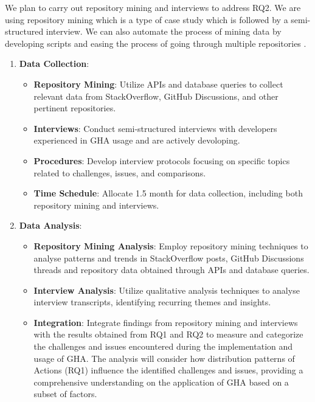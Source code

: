 \documentclass[conference]{IEEEtran}
\begin{document}
        We plan to carry out repository mining and interviews to address RQ2. We are using repository mining which is  a type of case study which is followed by a semi-structured interview. We can also automate the process of mining data by developing scripts and easing the process of going through multiple repositories \cite{chaturvedi2013tools}.\\

        \begin{enumerate}
            \item \textbf{Data Collection}:\\
            \begin{itemize}
                \item \textbf{Repository Mining}: Utilize APIs and database queries to collect relevant data from StackOverflow, GitHub Discussions, and other pertinent repositories.
                \item \textbf{Interviews}: Conduct semi-structured interviews with developers experienced in GHA usage and are actively devoloping.
                \item \textbf{Procedures}: Develop interview protocols focusing on specific topics related to challenges, issues, and comparisons.
                \item \textbf{Time Schedule}: Allocate 1.5 month for data collection, including both repository mining and interviews.\\
            \end{itemize}
            
            \item \textbf{Data Analysis}:\\
            \begin{itemize}
                \item \textbf{Repository Mining Analysis}: Employ repository mining techniques to analyse patterns and trends in StackOverflow posts, GitHub Discussions threads and repository data obtained through APIs and database queries.
                \item \textbf{Interview Analysis}: Utilize qualitative analysis techniques to analyse interview transcripts, identifying recurring themes and insights.
                \item \textbf{Integration}: Integrate findings from repository mining and interviews with the results obtained from RQ1 and RQ2 to measure and categorize the challenges and issues encountered during the implementation and usage of GHA. The analysis will consider how distribution patterns of Actions (RQ1) influence the identified challenges and issues, providing a comprehensive understanding on the application of GHA based on a subset of factors.\\
            \end{itemize}
        \end{enumerate}
\end{document}
